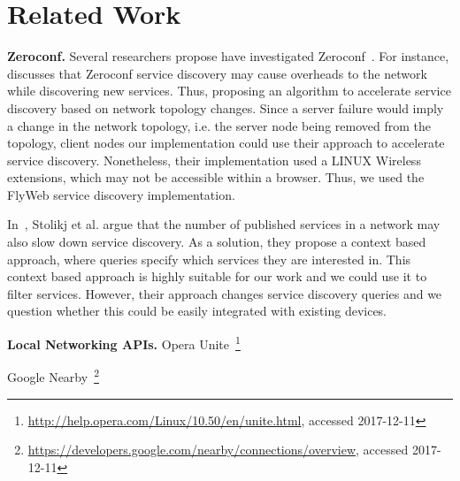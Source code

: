 \section{Related Work}
\label{sec:related_work}

\textbf{Zeroconf.}
Several researchers propose have investigated Zeroconf~\cite{Gunes2002, Bohnenkamp2003, Jara:2012:IPv6DNS-SD}.
For instance, \cite{hong2007accelerating} discusses that Zeroconf service discovery may cause overheads to the network while discovering new services.
Thus, proposing an algorithm to accelerate service discovery based on network topology changes.
Since a server failure would imply a change in the network topology, i.e. the server node being removed from the topology, 
client nodes our implementation could use their approach to accelerate service discovery. 
Nonetheless, their implementation used a LINUX Wireless extensions, which may not be accessible within a browser.
Thus, we used the FlyWeb service discovery implementation.

In~\cite{stolikj2016context}, Stolikj et al. argue that the number of published services in a network may also slow down service discovery.
As a solution, they propose a context based approach, where queries specify which services they are interested in.
This context based approach is highly suitable for our work and we could use it to filter \APIshort services.
However, their approach changes service discovery queries and we question whether this could be easily integrated with existing devices.


\textbf{Local Networking APIs.}
Opera Unite~\footnote{\url{http://help.opera.com/Linux/10.50/en/unite.html}, accessed 2017-12-11}

Google Nearby~\footnote{\url{https://developers.google.com/nearby/connections/overview}, accessed 2017-12-11}




